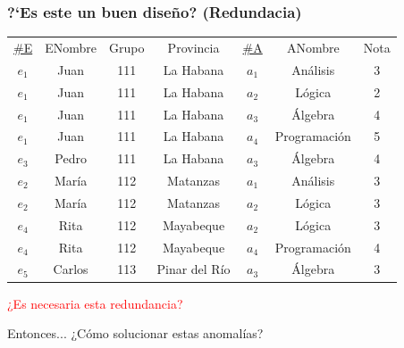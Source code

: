 \begin{frame}
    \frametitle{?`Es este un buen dise\~no? (Redundacia)}

    \centering
    \begin{tabular}{ccccccc}
        \underline{\#E} & ENombre & Grupo & Provincia & \underline{\#A} & ANombre & Nota\\
        $e_1$ & Juan & {\color{orange}111} & {\color{orange} La Habana} & $a_1$ & An\'alisis & 3\\
        $e_1$ & Juan & {\color{orange}111} & {\color{orange} La Habana} & $a_2$ & L\'ogica & 2\\
        $e_1$ & Juan & {\color{orange}111} & {\color{orange} La Habana} & $a_3$ & \'Algebra & 4\\
        $e_1$ & Juan & {\color{orange}111} & {\color{orange} La Habana} & $a_4$ & Programaci\'on & 5\\
        $e_3$ & Pedro & {\color{orange}111} & {\color{orange} La Habana} & $a_3$ & \'Algebra & 4\\
        $e_2$ & Mar\'ia & {\color{blue}112} & {\color{blue} Matanzas} & $a_1$ & An\'alisis & 3\\
        $e_2$ & Mar\'ia &  {\color{blue}112} & {\color{blue} Matanzas} & $a_2$ & L\'ogica & 3\\
        $e_4$ & Rita &  {\color{blue}112} & {\color{blue} Mayabeque} & $a_2$ & L\'ogica & 3\\
        $e_4$ & Rita &  {\color{blue}112} & {\color{blue} Mayabeque} & $a_4$ & Programaci\'on & 4\\
        $e_5$ & Carlos &  {\color{green}113} & {\color{green} Pinar del R\'io} & $a_3$ & \'Algebra & 3
    \end{tabular}
    \vspace{5mm}

    \centering
    {\textcolor{red}{¿Es necesaria esta redundancia?}}
\end{frame}








\begin{frame}{Entonces...}
    \centering
    \Large ¿C\'omo solucionar estas anomal\'ias?
\end{frame}

